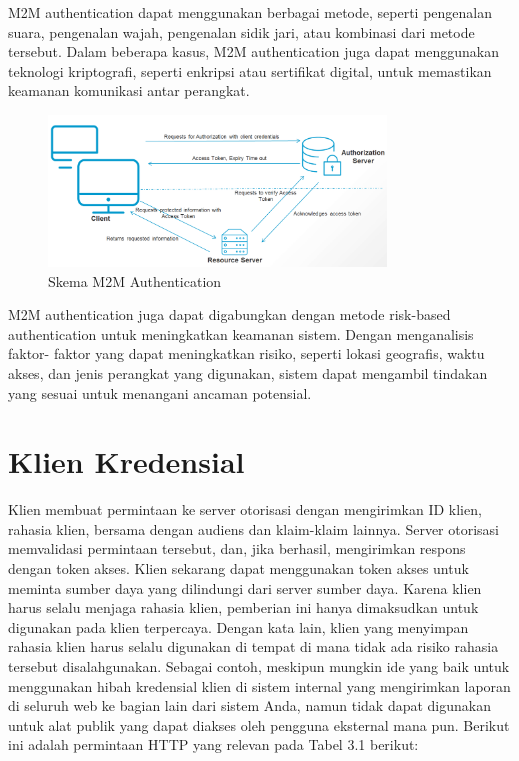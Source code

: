 M2M authentication dapat menggunakan berbagai metode, seperti pengenalan suara, pengenalan wajah, pengenalan sidik jari, atau kombinasi dari metode tersebut. Dalam beberapa kasus, M2M authentication juga dapat menggunakan teknologi kriptografi, seperti enkripsi atau sertifikat digital, untuk memastikan keamanan komunikasi antar perangkat.
\begin{figure}
    \centering
    \includegraphics[width=0.8\textwidth]{contents/chapter-3/m2m_auth.png}
    \caption{Skema M2M Authentication}
    \label{fig:my_label}
\end{figure}

M2M authentication juga dapat digabungkan dengan metode risk-based authentication untuk meningkatkan keamanan sistem. Dengan menganalisis faktor- faktor yang dapat meningkatkan risiko, seperti lokasi geografis, waktu akses, dan jenis perangkat yang digunakan, sistem dapat mengambil tindakan yang sesuai untuk menangani ancaman potensial.

\section{Klien Kredensial}
Klien membuat permintaan ke server otorisasi dengan mengirimkan ID klien, rahasia klien, bersama dengan audiens dan klaim-klaim lainnya. Server otorisasi memvalidasi permintaan tersebut, dan, jika berhasil, mengirimkan respons dengan token akses. Klien sekarang dapat menggunakan token akses untuk meminta sumber daya yang dilindungi dari server sumber daya.
Karena klien harus selalu menjaga rahasia klien, pemberian ini hanya dimaksudkan untuk digunakan pada klien terpercaya. Dengan kata lain, klien yang menyimpan rahasia klien harus selalu digunakan di tempat di mana tidak ada risiko rahasia tersebut disalahgunakan. Sebagai contoh, meskipun mungkin ide yang baik untuk menggunakan hibah kredensial klien di sistem internal yang mengirimkan laporan di seluruh web ke bagian lain dari sistem Anda, namun tidak dapat digunakan untuk alat publik yang dapat diakses oleh pengguna eksternal mana pun.
Berikut ini adalah permintaan HTTP yang relevan pada Tabel 3.1 berikut:

